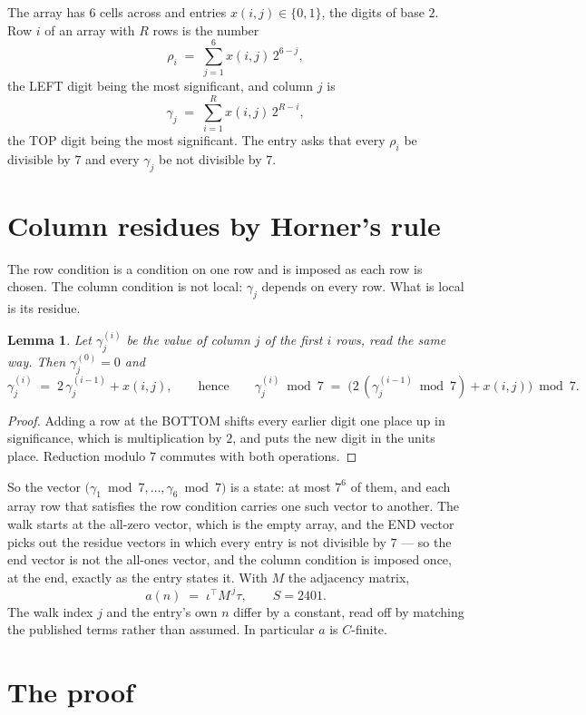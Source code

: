 \documentclass[11pt,a4paper]{article}
\theoremstyle{plain}
\newtheorem{lemma}[theorem]{Lemma}
\theoremstyle{definition}
\begin{document}
The array has $6$ cells across and entries $x(i,j)\in\{0,1\}$, the digits of
base $2$. Row $i$ of an array with $R$ rows is the number
\[
\rho_i\;=\;\sum_{j=1}^{6}x(i,j)\,2^{6-j} ,
\]
the LEFT digit being the most significant, and column $j$ is
\[
\gamma_j\;=\;\sum_{i=1}^{R}x(i,j)\,2^{R-i} ,
\]
the TOP digit being the most significant. The entry asks that every $\rho_i$ be divisible by
$7$ and every $\gamma_j$ be not divisible by $7$.


\section{Column residues by Horner's rule}

The row condition is a condition on one row and is imposed as each row is chosen. The column
condition is not local: $\gamma_j$ depends on every row. What is local is its residue.

\begin{lemma}\label{lem:horner}
Let $\gamma_j^{(i)}$ be the value of column $j$ of the first $i$ rows, read the same way.
Then $\gamma_j^{(0)}=0$ and
\[
\gamma_j^{(i)}\;=\;2\,\gamma_j^{(i-1)}+x(i,j),
\qquad\text{hence}\qquad
\gamma_j^{(i)}\bmod 7\;=\;
\bigl(2\,(\gamma_j^{(i-1)}\bmod 7)+x(i,j)\bigr)\bmod 7 .
\]
\end{lemma}

\begin{proof}
Adding a row at the BOTTOM shifts every earlier digit one place up in significance, which is
multiplication by $2$, and puts the new digit in the units place. Reduction modulo
$7$ commutes with both operations.
\end{proof}

So the vector $\bigl(\gamma_1\bmod 7,\dots,\gamma_{6}\bmod
7\bigr)$ is a state: at most $7^{6}$ of them, and each array row
that satisfies the row condition carries one such vector to another. The walk starts at the
all-zero vector, which is the empty array, and the END vector picks out the residue vectors in
which every entry is not divisible by $7$ --- so the end vector is not the all-ones
vector, and the column condition is imposed once, at the end, exactly as the entry states it.
With $M$ the adjacency matrix,
\[
a(n)\;=\;\iota^{\!\top}M^{\,j}\tau ,\qquad S=2401.
\]
The walk index $j$ and the entry's own $n$ differ by a constant, read off by matching the
published terms rather than assumed. In particular $a$ is $C$-finite.

\section{The proof}
\end{document}
